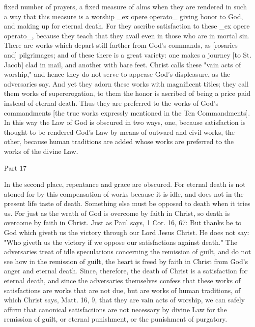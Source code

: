 fixed number of prayers, a fixed measure of alms when they are
rendered in such a way that this measure is a worship _ex opere
operato_ giving honor to God, and making up for eternal death.  For
they ascribe satisfaction to these _ex opere operato_, because they
teach that they avail even in those who are in mortal sin.  There are
works which depart still farther from God's commands, as [rosaries
and] pilgrimages; and of these there is a great variety: one makes a
journey [to St. Jacob] clad in mail, and another with bare feet.
Christ calls these "vain acts of worship," and hence they do not
serve to appease God's displeasure, as the adversaries say.  And yet
they adorn these works with magnificent titles; they call them works
of supererogation, to them the honor is ascribed of being a price
paid instead of eternal death.  Thus they are preferred to the works
of God's commandments [the true works expressly mentioned in the Ten
Commandments].  In this way the Law of God is obscured in two ways,
one, because satisfaction is thought to be rendered God's Law by
means of outward and civil works, the other, because human traditions
are added whose works are preferred to the works of the divine Law.




Part 17


In the second place, repentance and grace are obscured.  For eternal
death is not atoned for by this compensation of works because it is
idle, and does not in the present life taste of death.  Something
else must be opposed to death when it tries us.  For just as the
wrath of God is overcome by faith in Christ, so death is overcome by
faith in Christ.  Just as Paul says, 1 Cor. 16, 67: But thanks be to
God which giveth us the victory through our Lord Jesus Christ.  He
does not say: "Who giveth us the victory if we oppose our
satisfactions against death." The adversaries treat of idle
speculations concerning the remission of guilt, and do not see how in
the remission of guilt, the heart is freed by faith in Christ from
God's anger and eternal death.  Since, therefore, the death of Christ
is a satisfaction for eternal death, and since the adversaries
themselves confess that these works of satisfactions are works that
are not due, but are works of human traditions, of which Christ says,
Matt. 16, 9, that they are vain acts of worship, we can safely affirm
that canonical satisfactions are not necessary by divine Law for the
remission of guilt, or eternal punishment, or the punishment of
purgatory.

